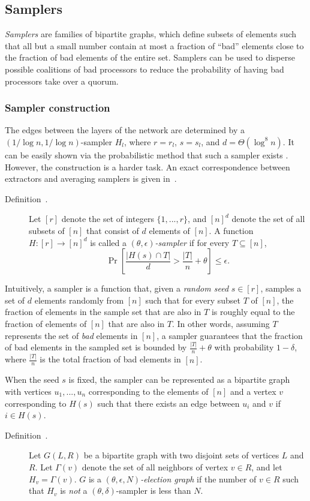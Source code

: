 \documentclass[10pt]{article}
\theoremstyle{plain}
\begin{document}
\subsection{Samplers}

\emph{Samplers} are families of bipartite graphs, which define subsets
of elements such that all but a small number contain at most a fraction
of ``bad'' elements close to the fraction of bad elements of the
entire set. Samplers can be used to disperse possible coalitions of
bad processors to reduce the probability of having bad processors
take over a quorum.%

\subsubsection{Sampler construction}

The edges between the layers of the network are determined by a $(1/\log{n},1/\log{n})$-sampler $H_{l}$, where
$r=r_{l}$, $s=s_{l}$, and $d=\Theta(\log^{8}{n})$. It can be easily
shown via the probabilistic method that such a sampler exists \cite{king:2006:leader}.
However, the construction is a harder task. An exact correspondence
between extractors and averaging samplers is given in~\cite{zuckerman-sampling}.

\begin{description}
	\item [{Definition~\cite{Gradwohl}.}] Let $[r]$ denote the set of integers
	$\{1,...,r\}$, and $[n]^{d}$ denote the set of all subsets of $[n]$
	that consist of $d$ elements of $[n]$. A function $H:[r]\to[n]^{d}$
	is called a \emph{$(\theta,\epsilon)$-sampler} if for every $T\subseteq[n]$,
	\[
	\Pr\left[\frac{|H(s)\cap T|}{d}>\frac{|T|}{n}+\theta\right]\leq\epsilon.
	\]
\end{description}
Intuitively, a sampler is a function that, given a \emph{random seed}
$s\in[r]$, samples a set of $d$ elements randomly from $[n]$ such
that for every subset $T$ of $[n]$, the fraction of elements in
the sample set that are also in $T$ is roughly equal to the fraction
of elements of $[n]$ that are also in $T$. In other words, assuming
$T$ represents the set of \emph{bad} elements in $[n]$, a sampler
guarantees that the fraction of bad elements in the sampled set is
bounded by $\frac{|T|}{n}+\theta$ with probability $1-\delta$, where
$\frac{|T|}{n}$ is the total fraction of bad elements in $[n]$.

When the seed $s$ is fixed, the sampler can be represented as a bipartite
graph with vertices $u_{1},...,u_{n}$ corresponding to the elements
of $[n]$ and a vertex $v$ corresponding to $H(s)$ such that there
exists an edge between $u_{i}$ and $v$ if $i\in H(s)$.
\begin{description}
	\item [{Definition~\cite{king:2006:p2p}.}] Let $G(L,R)$
	be a bipartite graph with two disjoint sets of vertices $L$ and $R$.
	Let $\Gamma(v)$ denote the set of all neighbors of vertex $v\in R$,
	and let $H_{v}=\Gamma(v)$. $G$ is a \emph{$(\theta,\epsilon,N)$-election
		graph} if the number of $v\in R$ such that $H_{v}$ is \emph{not}
	a $(\theta,\delta)$-sampler is less than $N$.
\end{description}
\end{document}
